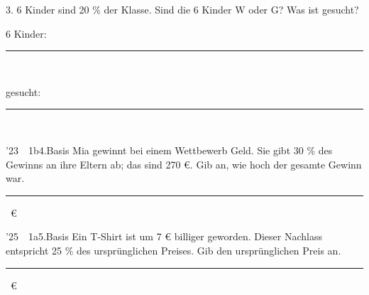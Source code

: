 \documentclass[11pt]{article}
\newcommand{\linie}[1]{\,{\color{black!45}\rule[-1pt]{#1}{0.4pt}}\,}
\newcommand{\pkt}{\textperiodcentered{}}
\begin{document}
\Needspace*{0.16\textheight}
\begin{pfaufg}{}{3.}{}
6 Kinder sind 20 \% der Klasse. Sind die 6 Kinder W oder G? Was ist gesucht?
\par\smallskip
\par\noindent \hfill\hfill 6 Kinder: \linie{30mm}\par\noindent\hfill gesucht: \linie{30mm}
\par{}
\end{pfaufg}
\begin{pfaufg}{’23~\pkt{}~1b}{4.}{Basis}
Mia gewinnt bei einem Wettbewerb Geld. Sie gibt 30 \% des Gewinns an ihre Eltern ab; das sind 270 €. Gib an, wie hoch der gesamte Gewinn war.
\hfill\linie{30mm} €
\end{pfaufg}
\begin{pfaufg}{’25~\pkt{}~1a}{5.}{Basis}
Ein T-Shirt ist um 7 € billiger geworden. Dieser Nachlass entspricht 25 \% des ursprünglichen Preises. Gib den ursprünglichen Preis an.
\hfill\linie{30mm} €
\end{pfaufg}

%
{}
\end{document}
